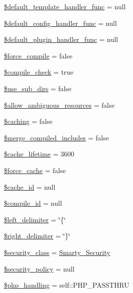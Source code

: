 \begin{DoxyCompactItemize}
\item 
\hyperlink{class_smarty_a9ff3231160bde6632ca8ad252918e3f0}{\$default\+\_\+template\+\_\+handler\+\_\+func} = null
\item 
\hyperlink{class_smarty_ab0f9856dab7dfa26d09a95ad15bae220}{\$default\+\_\+config\+\_\+handler\+\_\+func} = null
\item 
\hyperlink{class_smarty_a9186c4db9043d12dd9f4f654a0d30f68}{\$default\+\_\+plugin\+\_\+handler\+\_\+func} = null
\item 
\hyperlink{class_smarty_ac956f556d1b636556e96902d4d5377ff}{\$force\+\_\+compile} = false
\item 
\hyperlink{class_smarty_ab9662ea355e8e7c1f47ef0e568147512}{\$compile\+\_\+check} = true
\item 
\hyperlink{class_smarty_a9d2c3aa18168752d2a32b5aac08b25cd}{\$use\+\_\+sub\+\_\+dirs} = false
\item 
\hyperlink{class_smarty_a73f23bd0f148d47c24c36da40fcf29a8}{\$allow\+\_\+ambiguous\+\_\+resources} = false
\item 
\hyperlink{class_smarty_aa36073c4cda5c97981a5b99ca92208be}{\$caching} = false
\item 
\hyperlink{class_smarty_a9ff196d2db66487317e73d7a2c494646}{\$merge\+\_\+compiled\+\_\+includes} = false
\item 
\hyperlink{class_smarty_a5aaab753f75170fa670cbb602aa97119}{\$cache\+\_\+lifetime} = 3600
\item 
\hyperlink{class_smarty_a57e14bd7397e4236311ab75677092bbc}{\$force\+\_\+cache} = false
\item 
\hyperlink{class_smarty_aabdcf0100ec4fce78371b883f0c6cbf8}{\$cache\+\_\+id} = null
\item 
\hyperlink{class_smarty_a4c29af6f98e3049de95861b01a7bb00d}{\$compile\+\_\+id} = null
\item 
\hyperlink{class_smarty_a77e272b1cacbab4b26b4fe515e445178}{\$left\+\_\+delimiter} = \char`\"{}\{\char`\"{}
\item 
\hyperlink{class_smarty_ad3fe9ebfa998625e29836badfe1840bd}{\$right\+\_\+delimiter} = \char`\"{}\}\char`\"{}
\item 
\hyperlink{class_smarty_a678d027f0022db4a62539937fdf18a0f}{\$security\+\_\+class} = \textquotesingle{}\hyperlink{class_smarty___security}{Smarty\+\_\+\+Security}\textquotesingle{}
\item 
\hyperlink{class_smarty_a5268d7432b4de885ac265721a56fba85}{\$security\+\_\+policy} = null
\item 
\hyperlink{class_smarty_abb37c3c6b2bcb9a527c4139bffb7e6ca}{\$php\+\_\+handling} = self\+::\+P\+H\+P\+\_\+\+P\+A\+S\+S\+T\+H\+R\+U

\end{DoxyCompactItemize}
